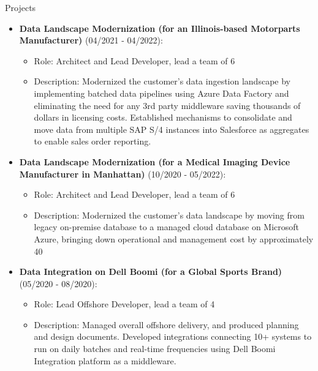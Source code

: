 \documentclass{resume} %
\begin{document}
\begin{rSection}{Projects}
        \begin{itemize}
            \item \textbf{Data Landscape Modernization (for an Illinois-based Motorparts Manufacturer)} (04/2021 - 04/2022):
            \begin{itemize}
                \item Role: Architect and Lead Developer, lead a team of 6
                \item Description: Modernized the customer's data ingestion landscape by implementing batched data pipelines using Azure Data Factory and eliminating the need for any 3rd party middleware saving thousands of dollars in licensing costs. Established mechanisms to consolidate and move data from multiple SAP S/4 instances into Salesforce as aggregates to enable sales order reporting.
            \end{itemize}
        \end{itemize}
        
        \begin{itemize}
            \item \textbf{Data Landscape Modernization (for a Medical Imaging Device Manufacturer in Manhattan)} (10/2020 - 05/2022):
            \begin{itemize}
                \item Role: Architect and Lead Developer, lead a team of 6
                \item Description: Modernized the customer's data landscape by moving from legacy on-premise database to a managed cloud database on Microsoft Azure, bringing down operational and management cost by approximately 40%
            \end{itemize}
        \end{itemize}
        
        \begin{itemize}
            \item \textbf{Data Integration on Dell Boomi (for a Global Sports Brand)} (05/2020 - 08/2020):
            \begin{itemize}
                \item Role: Lead Offshore Developer, lead a team of 4
                \item Description: Managed overall offshore delivery, and produced planning and design documents. Developed integrations connecting 10+ systems to run on daily batches and real-time frequencies using Dell Boomi Integration platform as a middleware.
            \end{itemize}
        \end{itemize}
        

\end{rSection}
\end{document}
